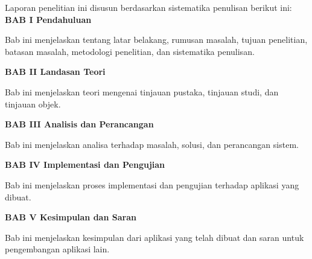 Laporan penelitian ini disusun berdasarkan sistematika penulisan berikut ini: \\[0.5cm]
\noindent 
\textbf{BAB I \hspace{1cm} Pendahuluan}
\begin{addmargin}[2.35cm]{0em}
Bab ini menjelaskan tentang latar belakang, rumusan masalah, tujuan penelitian, batasan masalah, metodologi penelitian, dan sistematika penulisan.
\end{addmargin}
\noindent 
\textbf{BAB II \hspace{0.8cm} Landasan Teori}
\begin{addmargin}[2.35cm]{0em}
Bab ini menjelaskan teori mengenai tinjauan pustaka, tinjauan studi, dan tinjauan objek.
\end{addmargin}
\noindent 
\textbf{BAB III \hspace{0.7cm} Analisis dan Perancangan}
\begin{addmargin}[2.35cm]{0em}
Bab ini menjelaskan analisa terhadap masalah, solusi, dan perancangan sistem.
\end{addmargin}
\noindent 
\textbf{BAB IV \hspace{0.7cm} Implementasi dan Pengujian}
\begin{addmargin}[2.35cm]{0em}
Bab ini menjelaskan proses implementasi dan pengujian terhadap aplikasi yang dibuat.
\end{addmargin}
\noindent \textbf{BAB V \hspace{0.8cm} Kesimpulan dan Saran}
\begin{addmargin}[2.35cm]{0em}
Bab ini menjelaskan kesimpulan dari aplikasi yang telah dibuat dan saran untuk pengembangan aplikasi lain.
\end{addmargin}

\newpage